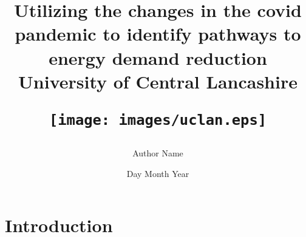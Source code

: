 \documentclass{article}
\title{
\begin{center}
{Utilizing the changes in the covid pandemic to identify pathways to energy demand reduction}\\
{\large University of Central Lancashire}\\

\hfill

{\texttt{[image: images/uclan.eps]}}
\end{center}
}
\author{Author Name}
\date{Day Month Year}
\begin{document}
\maketitle
\newpage
%

%
\newpage




\tableofcontents

 \section{Introduction}
 
 
 
 
\end{document}
